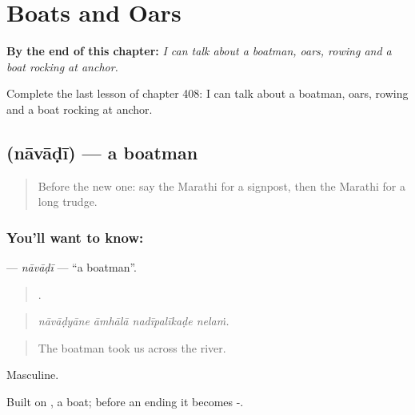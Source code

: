
\chapter{Boats and Oars}
\label{ch:mr-boats-and-oars}

\begin{chapteropening}
\textbf{By the end of this chapter:} \emph{I can talk about a boatman, oars, rowing and a boat rocking at anchor.}

Complete the last lesson of chapter 408: I can talk about a boatman, oars, rowing and a boat rocking at anchor.
\end{chapteropening}

\section[\texorpdfstring{\mr{नावाडी} (nāvāḍī)}{नावाडी (nāvāḍī)}]{ (nāvāḍī) — a boatman}

\label{lesson:MR-C408-navadi}



\begin{quote}
Before the new one: say the Marathi for a signpost, then the Marathi for a long trudge.
\end{quote}

\subsection*{You'll want to know: }
\textbf{} — \emph{nāvāḍī} — \textquotedblleft{}a boatman\textquotedblright{}.

\begin{quote}
   .
\end{quote}

\begin{quote}
\emph{nāvāḍyāne āmhālā nadīpalīkaḍe nelaṁ.}
\end{quote}

\begin{quote}
The boatman took us across the river.
\end{quote}

Masculine.

Built on , a boat; before an ending it becomes -.

